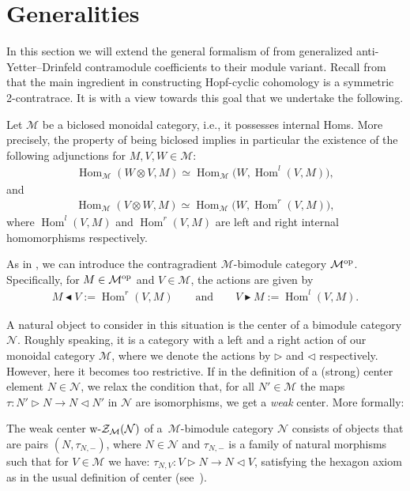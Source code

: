 \documentclass[10pt,a4paper]{amsart}
\newcommand{\Zc}{\mathcal{Z}}
\newcommand{\Nc}{\mathcal{N}}
\newcommand{\la}{\triangleright}
\newcommand{\ra}{\triangleleft}
\newcommand{\lab}{\blacktriangleright}
\newcommand{\rab}{\blacktriangleleft}
\numberwithin{equation}{section}
\begin{document}
\section{Generalities}\label{s:General}

In this section we will extend the general formalism of \cite{sk} from generalized anti-Yetter--Drinfeld contramodule coefficients to their module variant. Recall from \cite{hks} that the main ingredient in constructing Hopf-cyclic cohomology is a symmetric 2-contratrace. It is with a view towards this goal that we undertake the following.

 Let $\mathcal{M}$ be a biclosed monoidal category, i.e., it possesses internal Homs. More precisely, the property of being biclosed implies in particular the existence of the following adjunctions
 for $M, V, W\in \mathcal{M}$:
 \begin{gather*}
 \operatorname{Hom}_\mathcal{M} (W\otimes V, M) \simeq \operatorname{Hom}_\mathcal{M} \big(W, \operatorname{Hom}^l(V,M)\big),
 \end{gather*}
 and{\samepage
 \begin{gather*}
 \operatorname{Hom}_\mathcal{M} (V\otimes W, M) \simeq \operatorname{Hom}_\mathcal{M} \big(W, \operatorname{Hom}^r(V,M)\big),
 \end{gather*}
 where $\operatorname{Hom}^l(V,M) $ and $\operatorname{Hom}^r(V,M)$ are left and right internal homomorphisms respectively.}

As in \cite{s}, we can introduce the contragradient $\mathcal{M}$-bimodule category $\mathcal{M}^{\rm op}$. Specifically, for $M\in \mathcal{M}^{\rm op}$ and $V\in \mathcal{M}$, the actions are given by
 \begin{gather*}
 M\rab V := \operatorname{Hom}^r(V, M) \qquad \text{and} \qquad V\lab M :=\operatorname{Hom}^l(V, M) .
 \end{gather*}

A natural object to consider in this situation is the center of a bimodule category $\Nc$. Roughly speaking, it is a category with a left and a right action of our monoidal category $\mathcal{M}$, where we denote the actions by $\la$ and $\ra$ respectively. However, here it becomes too restrictive. If in the definition of a (strong) center element $N\in\Nc$, we relax the condition that, for all $N'\in\mathcal{M}$ the maps $\tau\colon N'\la N\to N\ra N'$ in $\Nc$ are isomorphisms, we get a \emph{weak} center. More formally:

 \begin{Definition} The weak center $ \text{\rm w-}\Zc_{\mathcal{M}}(\mathcal{N})$ of a~$\mathcal{M}$-bimodule category $\mathcal{N}$ consists of objects that are pairs $(N, \tau_{N,-})$, where $N \in \mathcal{N}$ and $\tau_{N,-}$ is a family of natural morphisms such that for $V \in \mathcal{M}$ we have: $\tau_{N,V}\colon V \la N \to N \ra V $, satisfying the hexagon axiom as in the usual definition of center (see~\cite{ENO}).
 \end{Definition}
\end{document}
